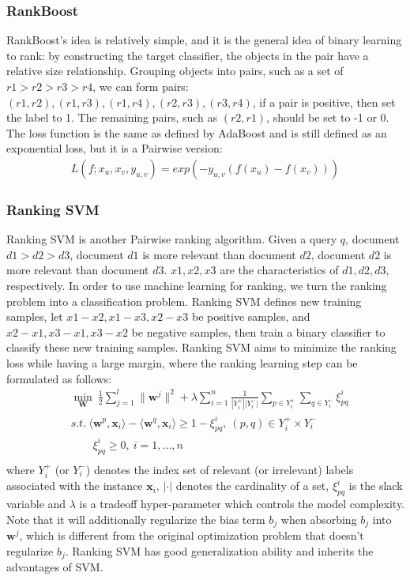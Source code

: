 \subsubsection{RankBoost}
RankBoost's idea is relatively simple, and it is the general idea of binary learning to rank: by constructing the target classifier, the objects in the pair have a relative size relationship. Grouping objects into pairs, such as a set of $r1> r2> r3> r4$, we can form pairs: $(r1, r2), (r1, r3), (r1, r4), (r2, r3), (r3, r4)$, if a pair is positive, then set the label to 1. The remaining pairs, such as $(r2, r1)$, should be set to -1 or 0.
The loss function is the same as defined by AdaBoost and is still defined as an exponential loss, but it is a Pairwise version:
\begin{equation}
\begin{aligned}
L(f;x_{u},x_{v},y_{u,v})=exp(-y_{u,v}(f(x_{u})-f(x_{v})))
\end{aligned}
\label{eqn:eq8}
\end{equation}
\subsubsection{Ranking SVM}
Ranking SVM is another Pairwise ranking algorithm. Given a query $q$, document $d1> d2> d3$, document $d1$ is more relevant than document $d2$, document $d2$ is more relevant than document $d3$. $x1, x2, x3$ are the characteristics of $d1, d2, d3$, respectively. In order to use machine learning for ranking, we turn the ranking problem into a classification problem. Ranking SVM defines new training samples, let $x1-x2, x1-x3, x2-x3$ be positive samples, and $x2-x1, x3-x1, x3-x2$ be negative samples, then train a binary classifier to classify these new training samples.
Ranking SVM aims to minimize the ranking loss while having a large margin, where the ranking learning step can be formulated as follows:
\begin{equation}
\begin{aligned}
& \min \limits_\mathbf{W} \ \frac{1}{2} \sum_{j=1}^{l} \| \mathbf{w}^j \|^2 + \lambda \sum_{i=1}^{n} \frac{1}{|Y_i^+||Y_i^-|} \sum_{p \in Y_i^+} \sum_{q \in Y_i^-} \xi_{pq}^i \\
		& s.t. \ \langle \mathbf{w}^p, \mathbf{x}_i \rangle - \langle \mathbf{w}^q, \mathbf{x}_i \rangle \geq 1 - \xi_{pq}^i, \ (p, q) \in Y_i^{+}  \times Y_i^{-} \\
		& \qquad \xi_{pq}^i \geq 0, \ i = 1,...,n \\ 
\end{aligned}
\label{eqn:eq9}
\end{equation}
where $Y_i^{+}$ (or $Y_i^{-}$) denotes the index set of relevant (or irrelevant) labels associated with the instance $\mathbf{x}_i$, $| \cdot |$ denotes the cardinality of a set, $\xi_{pq}^i$ is the slack variable and $\lambda$ is a tradeoff hyper-parameter which controls the model complexity. Note that it will additionally regularize the bias term $b_j$ when absorbing $b_j$ into $\mathbf{w}^j$, which is different from the original optimization problem that doesn't regularize $b_j$. Ranking SVM has good generalization ability and inherits the advantages of SVM.

